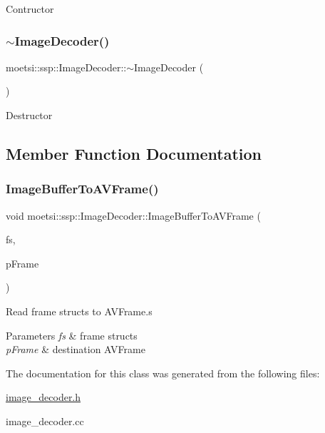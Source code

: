 Contructor \mbox{\label{classmoetsi_1_1ssp_1_1ImageDecoder_ad9bdd415935a982e8a36eb9d297e0f7f}} 
\subsubsection{\texorpdfstring{$\sim$\+Image\+Decoder()}{~ImageDecoder()}}
{\footnotesize\ttfamily moetsi\+::ssp\+::\+Image\+Decoder\+::$\sim$\+Image\+Decoder (\begin{DoxyParamCaption}{ }\end{DoxyParamCaption})}

Destructor 

\subsection{Member Function Documentation}
\mbox{\label{classmoetsi_1_1ssp_1_1ImageDecoder_a7a4e299977711727385c4c4e127453d2}} 
\subsubsection{\texorpdfstring{Image\+Buffer\+To\+A\+V\+Frame()}{ImageBufferToAVFrame()}}
{\footnotesize\ttfamily void moetsi\+::ssp\+::\+Image\+Decoder\+::\+Image\+Buffer\+To\+A\+V\+Frame (\begin{DoxyParamCaption}\item[{std\+::shared\+\_\+ptr$<$ \hyperlink{structmoetsi_1_1ssp_1_1FrameStruct}{Frame\+Struct} $>$ \&}]{fs,  }\item[{A\+V\+Frame\+SharedP}]{p\+Frame }\end{DoxyParamCaption})}

Read frame structs to A\+V\+Frame.\+s 
\begin{DoxyParams}{Parameters}
{\em fs} & frame structs \\
\hline
{\em p\+Frame} & destination A\+V\+Frame \\
\hline
\end{DoxyParams}


The documentation for this class was generated from the following files\+:\begin{DoxyCompactItemize}
\item 
\hyperlink{image__decoder_8h}{image\+\_\+decoder.\+h}\item 
image\+\_\+decoder.\+cc\end{DoxyCompactItemize}
